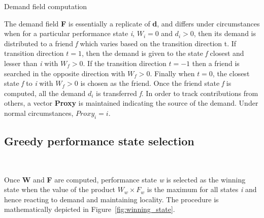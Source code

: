 \begin{algorithm}[h!]
 \SetLine
\caption{Demand field computation}
\label{fig:field}
\end{algorithm}


The demand field \textbf{F} is essentially a replicate of \textbf{d}, and differs under
circumstances when for a particular performance state \textit{i}, $W_i = 0$ and $d_i > 0$,
then its demand is distributed to a friend \textit{f} which varies based on the transition
direction t. If transition direction $t = 1$, then the demand is given to the state \textit{f} closest and lesser than
\textit{i} with $W_f > 0$. If the transition direction $t = -1$ then a friend is searched in 
the opposite direction with $W_f > 0$. Finally when $t = 0$, the closest state \textit{f} to \textit{i} with $W_f > 0$ is chosen as the 
friend. Once the friend state \textit{f} is computed, all the demand $d_i$ is transferred \textit{f}.
In order to track contributions from others, a vector \textbf{Proxy} is maintained indicating 
the source of the demand. Under normal circumstances, $Proxy_i = i$. 

\subsection{Greedy performance state selection}~\label{sec:winner_state}

Once \textbf{W} and \textbf{F} are computed, performance state \textit{w} is selected
as the winning state when the value of the product $W_w \times F_w$ is the maximum 
for all states \textit{i} and hence reacting to demand and maintaining locality. 
The procedure is mathematically depicted in Figure~\ref{fig:winning_state}.

